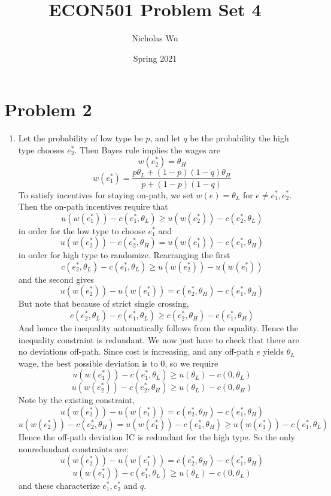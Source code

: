 \documentclass[10pt,letter]{article}
\begin{document}


\title{ECON501 Problem Set 4}

\author{Nicholas Wu}

\date{Spring 2021}

\maketitle

\section*{Problem 2}
\begin{enumerate}[label=(\alph*)]
\item Let the probability of low type be $p$, and let $q$ be the probability the high type chooses $e_2^*$. Then Bayes rule implies the wages are
\[ w(e_2^*)  = \theta_H \]
\[ w(e_1^*) = \frac{p \theta_L + (1-p)(1-q) \theta_H}{p + (1-p)(1-q)} \]
To satisfy incentives for staying on-path, we set $w(e) = \theta_L$ for $e \neq e_1^*, e_2^*$. Then the on-path incentives require that
\[ u(w(e_1^*)) - c(e_1^*, \theta_L) \ge u(w(e_2^*)) - c(e_2^*, \theta_L) \]
in order for the low type to choose $e_1^*$ and
\[ u(w(e_2^*)) - c(e_2^*, \theta_H) = u(w(e_1^*)) - c(e_1^*, \theta_H) \]
in order for high type to randomize. Rearranging the first
\[ c(e_2^*, \theta_L) - c(e_1^*, \theta_L) \ge u(w(e_2^*)) - u(w(e_1^*))  \]
and the second gives
\[ u(w(e_2^*)) - u(w(e_1^*))= c(e_2^*, \theta_H)  - c(e_1^*, \theta_H) \]
But note that because of strict single crossing,
\[ c(e_2^*, \theta_L) - c(e_1^*, \theta_L) \ge c(e_2^*, \theta_H)  - c(e_1^*, \theta_H) \]
And hence the inequality automatically follows from the equality. Hence the inequality constraint is redundant. We now just have to check that there are no deviations off-path. Since cost is increasing, and any off-path $e$ yields $\theta_L$ wage, the best possible deviation is to 0, so we require
\[ u(w(e_1^*)) - c(e_1^*, \theta_L) \ge u(\theta_L) - c(0, \theta_L) \]
\[ u(w(e_2^*)) - c(e_2^*, \theta_H) \ge u(\theta_L) - c(0, \theta_H) \]
Note by the existing constraint,
\[ u(w(e_2^*)) - u(w(e_1^*))= c(e_2^*, \theta_H)  - c(e_1^*, \theta_H) \]
\[ u(w(e_2^*)) - c(e_2^*, \theta_H)= u(w(e_1^*)) - c(e_1^*, \theta_H) \ge u(w(e_1^*)) - c(e_1^*, \theta_L)\]
Hence the off-path deviation IC is redundant for the high type. So the only nonredundant constraints are:
\[ u(w(e_2^*)) - u(w(e_1^*))= c(e_2^*, \theta_H)  - c(e_1^*, \theta_H) \]
\[ u(w(e_1^*)) - c(e_1^*, \theta_L) \ge u(\theta_L) - c(0, \theta_L) \]
and these characterize $e_1^*, e_2^*$ and $q$.


\end{enumerate}
\end{document}

